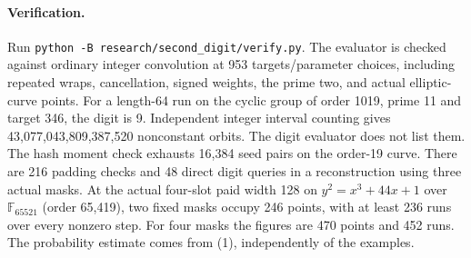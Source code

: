 \documentclass[11pt]{article}
\begin{document}
\paragraph{Verification.}
Run \texttt{python -B research/second\_digit/verify.py}.
The evaluator is checked against ordinary integer convolution at
953 targets/parameter choices, including repeated wraps, cancellation,
signed weights, the prime two, and actual elliptic-curve points.
For a length-64 run on the cyclic group of order 1019, prime 11 and
target 346, the digit is 9. Independent integer interval counting
gives 43,077,043,809,387,520 nonconstant orbits. The digit evaluator
does not list them. The hash moment check exhausts 16,384 seed pairs
on the order-19 curve. There are 216 padding checks and 48 direct
digit queries in a reconstruction using three actual masks. At the
actual four-slot paid width 128 on
$y^2=x^3+44x+1$ over $\mathbb F_{65521}$ (order 65,419), two fixed
masks occupy 246 points, with at least 236 runs over every nonzero
step. For four masks the figures are 470 points and 452 runs.
The probability estimate comes from (1), independently of the examples.
\end{document}
